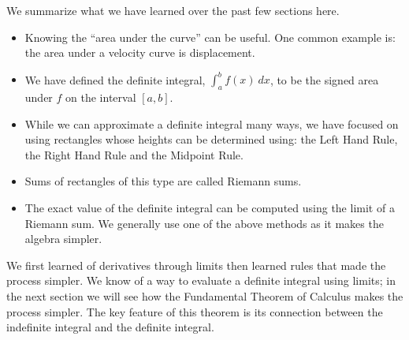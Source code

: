 We summarize what we have learned over the past few sections here.
\begin{itemize}
\item		Knowing the ``area under the curve'' can be useful. One common example is: the area under a velocity curve is displacement.
\item		We have defined the definite integral, $\int_a^b f(x)\ dx$, to be the signed area under $f$ on the interval $[a,b]$. 
\item		While we can approximate a definite integral many ways, we have focused on using rectangles whose heights can be determined using: the Left Hand Rule, the Right Hand Rule and the Midpoint Rule. 
\item		Sums of rectangles of this type are called Riemann sums.
\item		The exact value of the definite integral can be computed using the limit of a Riemann sum. We generally use one of the above methods as it makes the algebra simpler.
\end{itemize}

We first learned of derivatives through limits then learned rules that made the process simpler. We know of a way to evaluate a definite integral using limits; in the next section we will see how the Fundamental Theorem of Calculus makes the process simpler. The key feature of this theorem is its connection between the indefinite integral and the definite integral.

